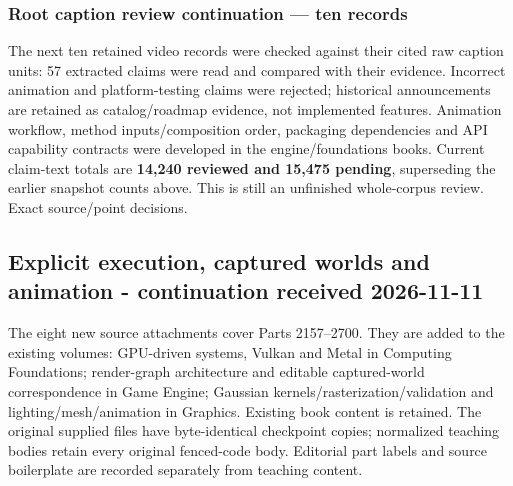 \subsubsection{Root caption review continuation --- ten records}\label{appendix-3b67654799a2-root-caption-review-continuation-ten-records}

The next ten retained video records were checked against their cited raw caption units: 57 extracted claims were read and compared with their evidence. Incorrect animation and platform-testing claims were rejected; historical announcements are retained as catalog/roadmap evidence, not implemented features. Animation workflow, method inputs/composition order, packaging dependencies and API capability contracts were developed in the engine/foundations books. Current claim-text totals are \textbf{14,240 reviewed and 15,475 pending}, superseding the earlier snapshot counts above. This is still an unfinished whole-corpus review. {Exact source/point decisions}.

\subsection{Explicit execution, captured worlds and animation - continuation received 2026-11-11}\label{appendix-3b67654799a2-explicit-execution-captured-worlds-and-animation---continuation-received-2026-11-11}

The eight new source attachments cover Parts 2157--2700. They are added to the existing volumes: GPU-driven systems, Vulkan and Metal in Computing Foundations; render-graph architecture and editable captured-world correspondence in Game Engine; Gaussian kernels/rasterization/validation and lighting/mesh/animation in Graphics. Existing book content is retained. The original supplied files have byte-identical checkpoint copies; normalized teaching bodies retain every original fenced-code body. Editorial part labels and source boilerplate are recorded separately from teaching content.

